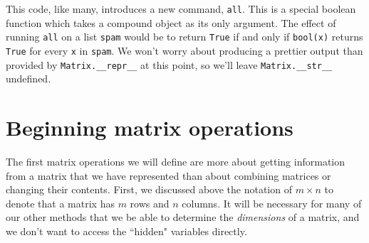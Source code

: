 \documentclass[m3380-lec-main.tex]{subfiles}
\begin{document}
\smallskip\noindent

This code, like many, introduces a new command, \verb|all|. This is a special boolean function which takes a compound object as its only argument. The effect of running \verb|all| on a list \verb|spam| would be to return \verb|True| if and only if \verb|bool(x)| returns \verb|True| for every \verb|x| in \verb|spam|. We won't worry about producing a prettier output than provided by \verb|Matrix.__repr__| at this point, so we'll leave \verb|Matrix.__str__| undefined.

\section{Beginning matrix operations}

The first matrix operations we will define are more about getting information from a matrix that we have represented than about combining matrices or changing their contents. First, we discussed above the notation of $m\times n$ to denote that a matrix has $m$ rows and $n$ columns. It will be necessary for many of our other methods that we be able to determine the \emph{dimensions} of a matrix, and we don't want to access the ``hidden" variables directly.
\end{document}
